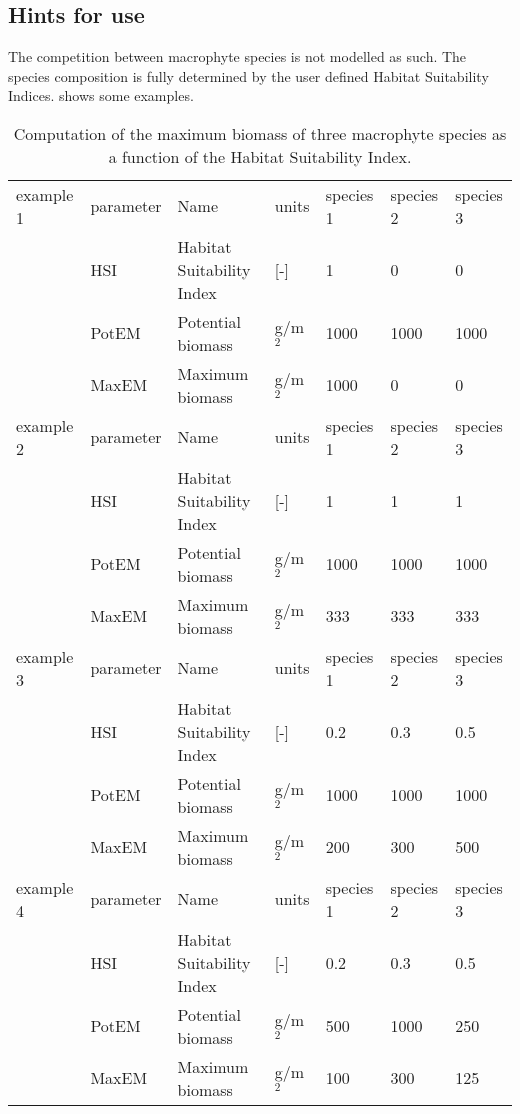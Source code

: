 \subsection{Hints for use}
The competition between macrophyte species is not modelled as such. The species composition is fully determined
by the user defined Habitat Suitability Indices.
 shows some examples.

\begin{table}
\caption{Computation of the maximum biomass of three macrophyte species as a function of the Habitat
Suitability Index.}
\label{tab:exampleHSI}
\begin{tabular}{lllllll} \hline
example 1       & parameter      & Name                      & units    & species 1  & species 2      & species 3 \\
                & HSI            & Habitat Suitability Index & [-]      & 1          & 0              & 0         \\
                & PotEM          & Potential biomass         & g/m$^2$  & 1000       & 1000           & 1000      \\
                & MaxEM          & Maximum biomass           & g/m$^2$  & 1000       & 0              & 0         \\
\hline
example 2       & parameter      & Name                      & units    & species 1  & species 2      & species 3 \\
                & HSI            & Habitat Suitability Index & [-]      & 1          & 1              & 1         \\
                & PotEM          & Potential biomass         & g/m$^2$  & 1000       & 1000           & 1000      \\
                & MaxEM          & Maximum biomass           & g/m$^2$  & 333        & 333            & 333       \\
\hline
example 3       & parameter      & Name                      & units    & species 1  & species 2      & species 3 \\
                & HSI            & Habitat Suitability Index & [-]      & 0.2        & 0.3            & 0.5       \\
                & PotEM          & Potential biomass         & g/m$^2$  & 1000       & 1000           & 1000      \\
                & MaxEM          & Maximum biomass           & g/m$^2$  & 200        & 300            & 500       \\
\hline
example 4       & parameter      & Name                      & units    & species 1  & species 2      & species 3 \\
                & HSI            & Habitat Suitability Index & [-]      & 0.2        & 0.3            & 0.5       \\
                & PotEM          & Potential biomass         & g/m$^2$  & 500        & 1000           & 250       \\
                & MaxEM          & Maximum biomass           & g/m$^2$  & 100        & 300            & 125       \\
\hline
\end{tabular}
\end{table}
